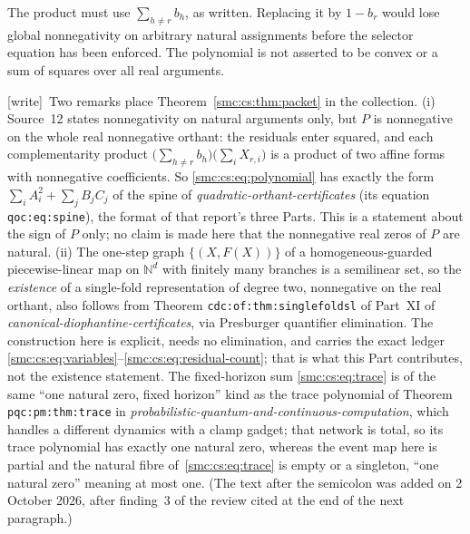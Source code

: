 \documentclass[11pt,letterpaper]{article}
\numberwithin{equation}{section}
\theoremstyle{definition}
\theoremstyle{remark}
\newcommand{\NN}{\mathbb N}
\newcommand{\wtag}{\textup{[write]}}
\begin{document}
The product must use $\sum_{h\ne r}b_h$, as written. Replacing it by $1-b_r$ would lose global nonnegativity on arbitrary natural assignments before the selector equation has been enforced. The polynomial is not asserted to be convex or a sum of squares over all real arguments.

\wtag\ Two remarks place Theorem~\ref{smc:cs:thm:packet} in the collection. (i) Source~12 states nonnegativity on natural arguments only, but $P$ is nonnegative on the whole real nonnegative orthant: the residuals enter squared, and each complementarity product $\bigl(\sum_{h\ne r}b_h\bigr)\bigl(\sum_iX_{r,i}\bigr)$ is a product of two affine forms with nonnegative coefficients. So \eqref{smc:cs:eq:polynomial} has exactly the form $\sum_iA_i^2+\sum_jB_jC_j$ of the spine of \emph{quadratic-orthant-certificates} (its equation \texttt{qoc:eq:spine}), the format of that report's three Parts. This is a statement about the sign of $P$ only; no claim is made here that the nonnegative real zeros of $P$ are natural. (ii) The one-step graph $\{(X,F(X))\}$ of a homogeneous-guarded piecewise-linear map on $\NN^d$ with finitely many branches is a semilinear set, so the \emph{existence} of a single-fold representation of degree two, nonnegative on the real orthant, also follows from Theorem \texttt{cdc:of:thm:singlefoldsl} of Part~XI of \emph{canonical-diophantine-certificates}, via Presburger quantifier elimination. The construction here is explicit, needs no elimination, and carries the exact ledger \eqref{smc:cs:eq:variables}--\eqref{smc:cs:eq:residual-count}; that is what this Part contributes, not the existence statement. The fixed-horizon sum \eqref{smc:cs:eq:trace} is of the same ``one natural zero, fixed horizon'' kind as the trace polynomial of Theorem \texttt{pqc:pm:thm:trace} in \emph{probabilistic-quantum-and-continuous-computation}, which handles a different dynamics with a clamp gadget; that network is total, so its trace polynomial has exactly one natural zero, whereas the event map here is partial and the natural fibre of~\eqref{smc:cs:eq:trace} is empty or a singleton, ``one natural zero'' meaning at most one. (The text after the semicolon was added on 2 October 2026, after finding~3 of the review cited at the end of the next paragraph.)
\end{document}
